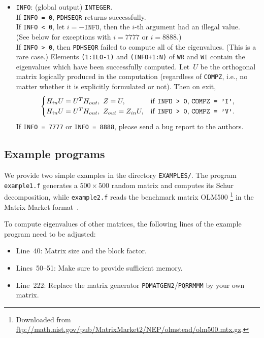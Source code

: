 \documentclass{article}
\begin{document}
\begin{itemize}
\item \texttt{INFO}: (global output) \texttt{INTEGER}.\\
If \texttt{INFO = 0}, \texttt{PDHSEQR} returns successfully.\\
If \texttt{INFO < 0}, let $i=-\texttt{INFO}$, then the $i$-th argument had an
illegal value.\\
(See below for exceptions with $i=7777$ or $i=8888$.)\\
If \texttt{INFO > 0}, then \texttt{PDHSEQR} failed to compute all of the
eigenvalues.
(This is a rare case.)
Elements \texttt{(1:ILO-1)} and \texttt{(INFO+1:N)} of \texttt{WR} and
\texttt{WI} contain the eigenvalues which have been successfully computed.
Let~$U$ be the orthogonal matrix logically produced in the computation
(regardless of \texttt{COMPZ}, i.e., no matter whether it is explicitly
formulated or not).
Then on exit,
\[
\begin{cases}
H_{in}U=U^TH_{out},~Z=U,
& \text{if \texttt{INFO > 0}, \texttt{COMPZ = 'I'},}\\
H_{in}U=U^TH_{out},~Z_{out}=Z_{in}U,
& \text{if \texttt{INFO > 0}, \texttt{COMPZ = 'V'}.}
\end{cases}
\]
If \texttt{INFO = 7777} or \texttt{INFO = 8888}, please send a bug report to
the authors.
\end{itemize}

\subsection{Example programs}
We provide two simple examples in the directory \texttt{EXAMPLES/}.
The program 
\texttt{example1.f} generates a $500\times500$ random matrix and computes
its Schur decomposition, while \texttt{example2.f} reads the benchmark
matrix OLM500%
\footnote{Downloaded from
\url{ftp://math.nist.gov/pub/MatrixMarket2/NEP/olmstead/olm500.mtx.gz}.}
in the Matrix Market format~\cite{MatrixMarket}.

To compute eigenvalues of other matrices, the following lines of the example
program need to be adjusted:
\begin{itemize}
\item Line~40: Matrix size and the block factor.
\item Lines~50--51: Make sure to provide sufficient memory.
\item Line~222: Replace the matrix generator
\texttt{PDMATGEN2}/\texttt{PQRRMMM} by your own matrix.
\end{itemize}
\end{document}

